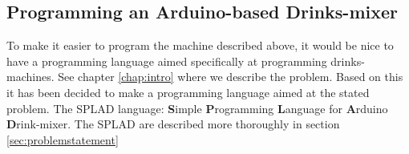 \subsection{Programming an Arduino-based Drinks-mixer}
To make it easier to program the machine described above, it would be nice to have a programming language aimed specifically at programming drinks-machines. See chapter \ref{chap:intro} where we describe the problem. Based on this it has been decided to make a programming language aimed at the stated problem. The SPLAD language: \textbf{S}imple \textbf{P}rogramming \textbf{L}anguage for \textbf{A}rduino \textbf{D}rink-mixer. The SPLAD are described more thoroughly in section \ref{sec:problemstatement}